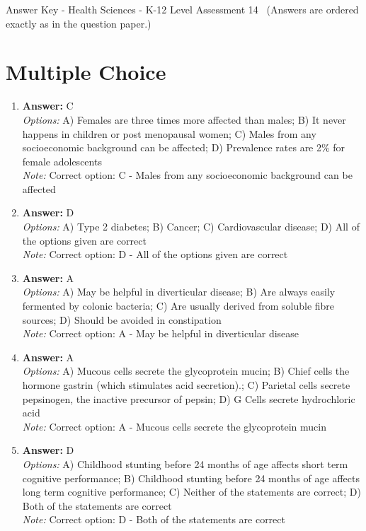 \documentclass[12pt]{article}
\begin{document}
\begin{center}
Answer Key - Health Sciences - K-12 Level Assessment 14 \
\small (Answers are ordered exactly as in the question paper.)
\end{center}

\section*{Multiple Choice}
\begin{enumerate}[label=\arabic*.]
\item \textbf{Answer:} C
\\ \textit{Options:} A) Females are three times more affected than males; B) It never happens in children or post menopausal women; C) Males from any socioeconomic background can be affected; D) Prevalence rates are 2\% for female adolescents
\\ \textit{Note:} Correct option: C - Males from any socioeconomic background can be affected
\item \textbf{Answer:} D
\\ \textit{Options:} A) Type 2 diabetes; B) Cancer; C) Cardiovascular disease; D) All of the options given are correct
\\ \textit{Note:} Correct option: D - All of the options given are correct
\item \textbf{Answer:} A
\\ \textit{Options:} A) May be helpful in diverticular disease; B) Are always easily fermented by colonic bacteria; C) Are usually derived from soluble fibre sources; D) Should be avoided in constipation
\\ \textit{Note:} Correct option: A - May be helpful in diverticular disease
\item \textbf{Answer:} A
\\ \textit{Options:} A) Mucous cells secrete the glycoprotein mucin; B) Chief cells the hormone gastrin (which stimulates acid secretion).; C) Parietal cells secrete pepsinogen, the inactive precursor of pepsin; D) G Cells secrete hydrochloric acid
\\ \textit{Note:} Correct option: A - Mucous cells secrete the glycoprotein mucin
\item \textbf{Answer:} D
\\ \textit{Options:} A) Childhood stunting before 24 months of age affects short term cognitive performance; B) Childhood stunting before 24 months of age affects long term cognitive performance; C) Neither of the statements are correct; D) Both of the statements are correct
\\ \textit{Note:} Correct option: D - Both of the statements are correct
\end{enumerate}
\end{document}

